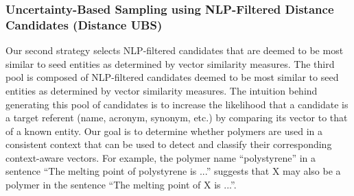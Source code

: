 \subsubsection{Uncertainty-Based Sampling using NLP-Filtered Distance Candidates (Distance UBS)}
Our second strategy selects NLP-filtered candidates that are 
deemed to be most similar to seed entities as determined by vector similarity measures.
The third pool is composed of NLP-filtered candidates deemed to be most similar to seed entities as determined by vector similarity measures.
The intuition behind generating this pool of candidates is to increase the likelihood that a candidate is a target referent (name, acronym, synonym, etc.) by comparing its vector to that of a known entity.
Our goal is to determine whether polymers are used in a consistent context that can be used to detect and classify their corresponding context-aware vectors.
For example, the polymer name ``polystyrene'' in a sentence ``The
melting point of polystyrene is ...'' suggests that X may also be a polymer in the
sentence ``The melting point of X is ...''.


